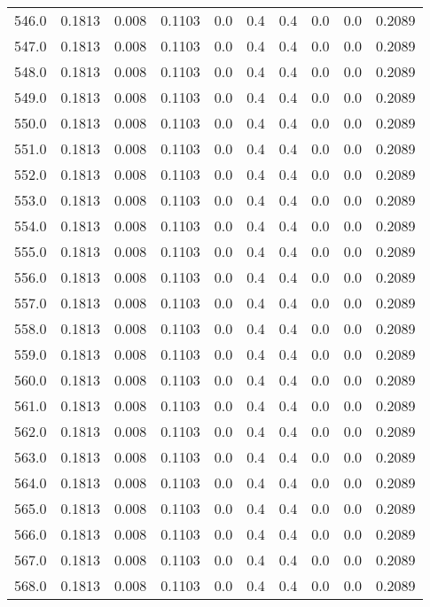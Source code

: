 \begin{longtable}{lrrrrrrrrr}
546.0 & 0.1813 & 0.008 & 0.1103 & 0.0 & 0.4 & 0.4 & 0.0 & 0.0 & 0.2089 \\
547.0 & 0.1813 & 0.008 & 0.1103 & 0.0 & 0.4 & 0.4 & 0.0 & 0.0 & 0.2089 \\
548.0 & 0.1813 & 0.008 & 0.1103 & 0.0 & 0.4 & 0.4 & 0.0 & 0.0 & 0.2089 \\
549.0 & 0.1813 & 0.008 & 0.1103 & 0.0 & 0.4 & 0.4 & 0.0 & 0.0 & 0.2089 \\
550.0 & 0.1813 & 0.008 & 0.1103 & 0.0 & 0.4 & 0.4 & 0.0 & 0.0 & 0.2089 \\
551.0 & 0.1813 & 0.008 & 0.1103 & 0.0 & 0.4 & 0.4 & 0.0 & 0.0 & 0.2089 \\
552.0 & 0.1813 & 0.008 & 0.1103 & 0.0 & 0.4 & 0.4 & 0.0 & 0.0 & 0.2089 \\
553.0 & 0.1813 & 0.008 & 0.1103 & 0.0 & 0.4 & 0.4 & 0.0 & 0.0 & 0.2089 \\
554.0 & 0.1813 & 0.008 & 0.1103 & 0.0 & 0.4 & 0.4 & 0.0 & 0.0 & 0.2089 \\
555.0 & 0.1813 & 0.008 & 0.1103 & 0.0 & 0.4 & 0.4 & 0.0 & 0.0 & 0.2089 \\
556.0 & 0.1813 & 0.008 & 0.1103 & 0.0 & 0.4 & 0.4 & 0.0 & 0.0 & 0.2089 \\
557.0 & 0.1813 & 0.008 & 0.1103 & 0.0 & 0.4 & 0.4 & 0.0 & 0.0 & 0.2089 \\
558.0 & 0.1813 & 0.008 & 0.1103 & 0.0 & 0.4 & 0.4 & 0.0 & 0.0 & 0.2089 \\
559.0 & 0.1813 & 0.008 & 0.1103 & 0.0 & 0.4 & 0.4 & 0.0 & 0.0 & 0.2089 \\
560.0 & 0.1813 & 0.008 & 0.1103 & 0.0 & 0.4 & 0.4 & 0.0 & 0.0 & 0.2089 \\
561.0 & 0.1813 & 0.008 & 0.1103 & 0.0 & 0.4 & 0.4 & 0.0 & 0.0 & 0.2089 \\
562.0 & 0.1813 & 0.008 & 0.1103 & 0.0 & 0.4 & 0.4 & 0.0 & 0.0 & 0.2089 \\
563.0 & 0.1813 & 0.008 & 0.1103 & 0.0 & 0.4 & 0.4 & 0.0 & 0.0 & 0.2089 \\
564.0 & 0.1813 & 0.008 & 0.1103 & 0.0 & 0.4 & 0.4 & 0.0 & 0.0 & 0.2089 \\
565.0 & 0.1813 & 0.008 & 0.1103 & 0.0 & 0.4 & 0.4 & 0.0 & 0.0 & 0.2089 \\
566.0 & 0.1813 & 0.008 & 0.1103 & 0.0 & 0.4 & 0.4 & 0.0 & 0.0 & 0.2089 \\
567.0 & 0.1813 & 0.008 & 0.1103 & 0.0 & 0.4 & 0.4 & 0.0 & 0.0 & 0.2089 \\
568.0 & 0.1813 & 0.008 & 0.1103 & 0.0 & 0.4 & 0.4 & 0.0 & 0.0 & 0.2089 \\

\end{longtable}

